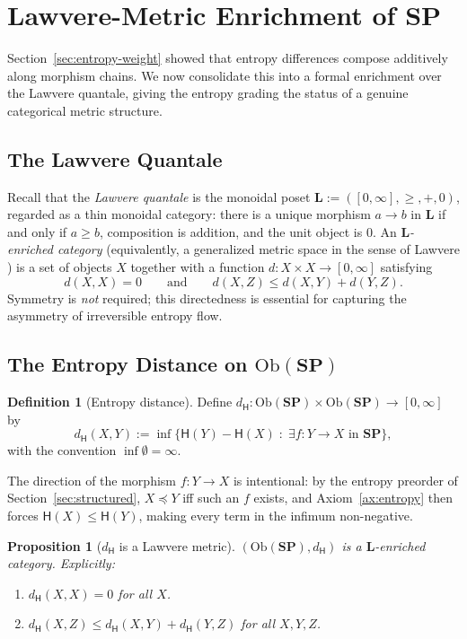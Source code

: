 \documentclass[12pt,a4paper]{article}
\newtheorem{proposition}[theorem]{Proposition}
\theoremstyle{definition}
\newtheorem{definition}[theorem]{Definition}
\theoremstyle{remark}
\newcommand{\Ent}{\ensuremath{\mathsf{H}}}
\newcommand{\SP}{\mathbf{SP}}
\newcommand{\Ob}{\mathrm{Ob}}
\begin{document}
\section{Lawvere-Metric Enrichment of \texorpdfstring{$\SP$}{SP}}
\label{sec:lawvere}

Section~\ref{sec:entropy-weight} showed that entropy differences compose
additively along morphism chains. We now consolidate this into a formal
enrichment over the Lawvere quantale, giving the entropy grading the status
of a genuine categorical metric structure.

\subsection{The Lawvere Quantale}

Recall that the \emph{Lawvere quantale} is the monoidal poset
$\mathbf{L}:=([0,\infty],\ge,+,0)$, regarded as a thin monoidal category:
there is a unique morphism $a\to b$ in $\mathbf{L}$ if and only if $a\ge b$,
composition is addition, and the unit object is $0$.
An \emph{$\mathbf{L}$-enriched category} (equivalently, a generalized metric
space in the sense of Lawvere \citep{lawvere1970}) is a set of objects $X$
together with a function $d:X\times X\to[0,\infty]$ satisfying
\[
  d(X,X)=0 \qquad\text{and}\qquad d(X,Z)\le d(X,Y)+d(Y,Z).
\]
Symmetry is \emph{not} required; this directedness is essential for capturing
the asymmetry of irreversible entropy flow.

\subsection{The Entropy Distance on \texorpdfstring{$\Ob(\SP)$}{Ob(SP)}}

\begin{definition}[Entropy distance]
\label{def:entropy-dist}
Define $d_{\Ent}:\Ob(\SP)\times\Ob(\SP)\to[0,\infty]$ by
\[
  d_{\Ent}(X,Y) :=
  \inf\bigl\{\Ent(Y)-\Ent(X)\;:\;\exists f:Y\to X\text{ in }\SP\bigr\},
\]
with the convention $\inf\emptyset=\infty$.
\end{definition}

The direction of the morphism $f:Y\to X$ is intentional: by the entropy
preorder of Section~\ref{sec:structured}, $X\preceq Y$ iff such an $f$
exists, and Axiom~\ref{ax:entropy} then forces $\Ent(X)\le\Ent(Y)$, making
every term in the infimum non-negative.

\begin{proposition}[$d_{\Ent}$ is a Lawvere metric]
\label{prop:lawvere-metric}
$(\Ob(\SP),d_{\Ent})$ is a $\mathbf{L}$-enriched category. Explicitly:
\begin{enumerate}[label=(\roman*)]
  \item $d_{\Ent}(X,X)=0$ for all $X$.
  \item $d_{\Ent}(X,Z)\le d_{\Ent}(X,Y)+d_{\Ent}(Y,Z)$ for all $X,Y,Z$.
\end{enumerate}
\end{proposition}
\end{document}
